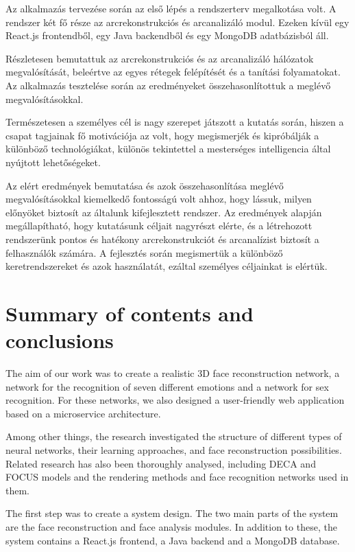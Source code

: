 \documentclass[12pt,a4]{article}
\begin{document}
        Az alkalmazás tervezése során az első lépés a rendszerterv megalkotása volt. 
        A rendszer két fő része az arcrekonstrukciós és arcanalizáló modul. Ezeken kívül
        egy React.js frontendből, egy Java backendből és egy MongoDB adatbázisból áll.
        
        Részletesen bemutattuk az arcrekonstrukciós és az arcanalizáló hálózatok megvalósítását, 
        beleértve az egyes rétegek felépítését és a tanítási folyamatokat. Az alkalmazás tesztelése során az eredményeket összehasonlítottuk a meglévő megvalósításokkal.

        Természetesen a személyes cél is nagy szerepet játszott a kutatás során, hiszen a csapat tagjainak fő motivációja az volt, hogy megismerjék és kipróbálják a különböző technológiákat, különös tekintettel a mesterséges intelligencia által nyújtott lehetőségeket.

        Az elért eredmények bemutatása és azok összehasonlítása meglévő megvalósításokkal kiemelkedő fontosságú volt ahhoz, hogy lássuk, milyen előnyöket biztosít az általunk kifejlesztett rendszer. Az eredmények alapján megállapítható, hogy kutatásunk céljait nagyrészt elérte, és a létrehozott rendszerünk pontos és hatékony arcrekonstrukciót és arcanalízist biztosít a felhasználók számára. A fejlesztés során megismertük a különböző keretrendszereket és azok használatát, ezáltal személyes céljainkat is elértük.

    \section{Summary of contents and conclusions}

        The aim of our work was to create a realistic 3D face reconstruction network, a network for the recognition of seven different emotions and a network for sex recognition. For these networks, we also designed a user-friendly web application based on a microservice architecture.
    
        Among other things, the research investigated the structure of different types of neural networks, their learning approaches, and face reconstruction possibilities. Related research has also been thoroughly analysed, including DECA and FOCUS models and the rendering methods and face recognition networks used in them.

        The first step was to create a system design. 
        The two main parts of the system are the face reconstruction and face analysis modules. In addition to these, the system contains a React.js frontend, a Java backend and a MongoDB database.
\end{document}
